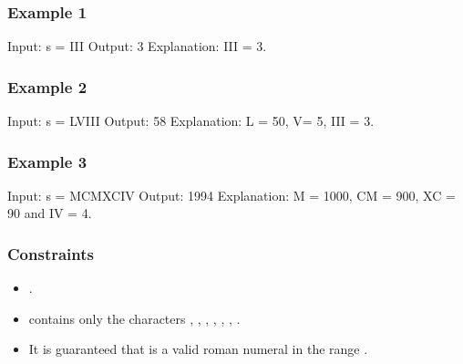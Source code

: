 \documentclass[letterpaper,12pt,english]{book}
\begin{document}
\subsubsection{Example 1}
\label{\detokenize{Hash_Table/03_H_13_Roman_to_Integer:example-1}}
\begin{sphinxVerbatim}[commandchars=\\\{\}]
Input: s = \PYGZdq{}III\PYGZdq{}
Output: 3
Explanation: III = 3.
\end{sphinxVerbatim}


\subsubsection{Example 2}
\label{\detokenize{Hash_Table/03_H_13_Roman_to_Integer:example-2}}
\begin{sphinxVerbatim}[commandchars=\\\{\}]
Input: s = \PYGZdq{}LVIII\PYGZdq{}
Output: 58
Explanation: L = 50, V= 5, III = 3.
\end{sphinxVerbatim}


\subsubsection{Example 3}
\label{\detokenize{Hash_Table/03_H_13_Roman_to_Integer:example-3}}
\begin{sphinxVerbatim}[commandchars=\\\{\}]
Input: s = \PYGZdq{}MCMXCIV\PYGZdq{}
Output: 1994
Explanation: M = 1000, CM = 900, XC = 90 and IV = 4.
\end{sphinxVerbatim}


\subsubsection{Constraints}
\label{\detokenize{Hash_Table/03_H_13_Roman_to_Integer:constraints}}\begin{itemize}
\item {} 
\sphinxAtStartPar
{}.

\item {} 
\sphinxAtStartPar
{} contains only the characters , , , , , , .

\item {} 
\sphinxAtStartPar
It is guaranteed that  is a valid roman numeral in the range \sphinxcode{\sphinxupquote{{[}1, 3999{]}}}.

\end{itemize}
\end{document}
